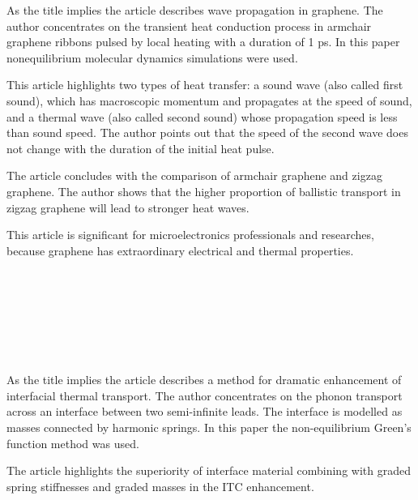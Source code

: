 \documentclass[main.tex]{subfiles}
\begin{document}
\setcounter{subsection}{3}
As the title implies the article describes wave propagation in graphene.
The author concentrates on the transient heat conduction process in armchair graphene ribbons pulsed by local heating with a duration of 1 ps.
In this paper nonequilibrium molecular dynamics simulations were used.\par
This article highlights two types of heat transfer: a sound wave (also called first sound), which has macroscopic momentum and propagates at the speed of sound, and a thermal wave (also called second sound) whose propagation speed is less than sound speed.
The author points out that the speed of the second wave does not change with the duration of the initial heat pulse.\par
The article concludes with the comparison of armchair graphene and zigzag graphene. The author shows that the higher proportion of ballistic transport in zigzag graphene will lead to stronger heat waves.\par
This article is significant for microelectronics professionals and researches, because graphene has extraordinary electrical and thermal properties.
\ \\\\
\newpage


\setcounter{subsection}{4}

\ \\\\
\newpage


\setcounter{subsection}{5}

\ \\\\
\newpage


\setcounter{subsection}{6}
As the title implies the article describes a method for dramatic enhancement of interfacial thermal transport.
The author concentrates on the phonon transport across an interface between two semi-infinite leads.
The interface is modelled as masses connected by harmonic springs.
In this paper the non-equilibrium Green's function method was used.\par
The article highlights the superiority of interface material combining with graded spring stiffnesses and graded masses in the ITC enhancement.
\ \\\\
\newpage
\end{document}
